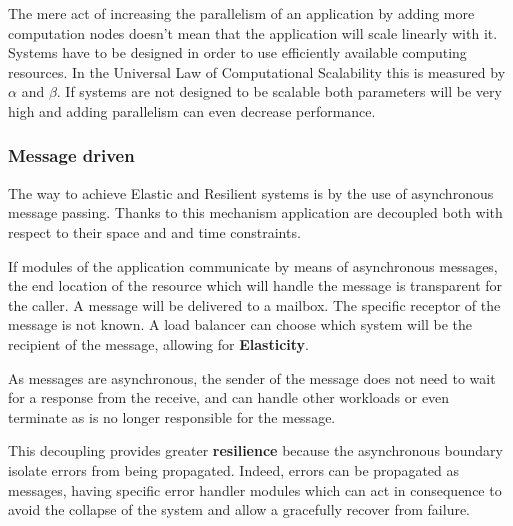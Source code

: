 \documentclass[../main.tex]{subfiles}
\begin{document}
The mere act of increasing the parallelism of an application by adding more
computation nodes doesn't mean that the application will scale linearly with it.
Systems have to be designed in order to use efficiently available computing resources.
In the Universal Law of Computational Scalability this is measured by $\alpha$
and $\beta$. If systems are not designed to be scalable both parameters will
be very high and adding parallelism can even decrease performance.

\subsubsection{Message driven}

The way to achieve Elastic and Resilient systems is by the use of asynchronous
message passing. Thanks to this mechanism application are decoupled both with respect to
their space and and time constraints.


If modules of the application communicate by means of asynchronous messages, the end
location of the resource which will handle the message is transparent for the
caller. A message will be delivered to a mailbox. The specific receptor of the
message is not known. A load balancer can choose which system will be the recipient
of the message, allowing for \textbf{Elasticity}.

As messages are asynchronous, the sender of the message does not need to wait for
a response from the receive, and can handle other workloads or even
terminate as is no longer responsible for the message.

This decoupling provides greater \textbf{resilience} because the asynchronous
boundary isolate errors from being propagated. Indeed, errors can be propagated
as messages, having specific error handler modules which can act in consequence
to avoid the collapse of the system and allow a gracefully recover from failure.
\end{document}
